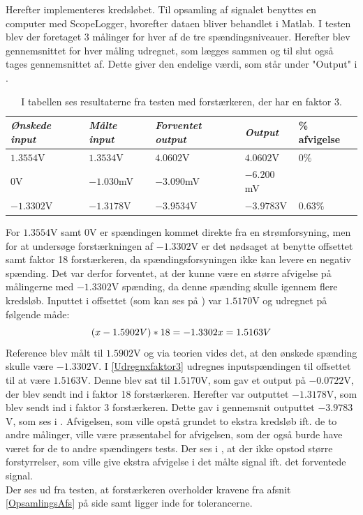 \noindent Herefter implementeres kredsløbet. Til opsamling af signalet benyttes en computer med ScopeLogger, hvorefter dataen bliver behandlet i Matlab. I testen blev der foretaget 3 målinger for hver af de tre spændingsniveauer. Herefter blev gennemsnittet for hver måling udregnet, som lægges sammen og til slut også tages gennemsnittet af. Dette giver den endelige værdi, som står under "Output" i .\

\begin{table}[H]
	\centering
	\begin{tabular}{|l|l|l|l|l|}
		\hline
		\textit{Ønskede input} & \textit{Målte input} & \textit{Forventet output} & \textit{Output} & \% afvigelse \\ \hline
		$1.3554$V              & $1.3534$V            & $4.0602$V                 & $4.0602$V       & $0\%$        \\ \hline
		$0$V                   & $-1.030$mV           & $-3.090$mV                & $-6.200$mV      &              \\ \hline
		$-1.3302$V             & $-1.3178$V           & $-3.9534$V                & $-3.9783$V      & $0.63\%$     \\ \hline
	\end{tabular}
	\caption{I tabellen ses resultaterne fra testen med forstærkeren, der har en faktor 3.}
	\label{Tab:faktor3_test}
\end{table}

For $1.3554$V samt $0$V er spændingen kommet direkte fra en strømforsyning, men for at undersøge forstærkningen af $-1.3302$V er det nødsaget at benytte offsettet samt faktor 18 forstærkeren, da spændingsforsyningen ikke kan levere en negativ spænding. Det var derfor forventet, at der kunne være en større afvigelse på målingerne med $-1.3302$V spænding, da denne spænding skulle igennem flere kredsløb. Inputtet i offsettet (som kan ses på ) var $1.5170$V og udregnet på følgende måde:
\begin{equation}\label{Udregnxfaktor3}
( x - 1.5902V ) * 18 = -1.3302 \\
x = 1.5163V
\end{equation}
Reference blev målt til $1.5902$V og via teorien vides det, at den ønskede spænding skulle være $-1.3302$V. I \eqref{Udregnxfaktor3} udregnes inputspændingen til offsettet til at være $1.5163$V. Denne blev sat til $1.5170$V, som gav et output på $-0.0722$V, der blev sendt ind i faktor 18 forstærkeren. Herefter var outputtet $-1.3178$V, som blev sendt ind i faktor 3 forstærkeren. Dette gav i gennemsnit outputtet $-3.9783$V, som ses i . Afvigelsen, som ville opstå grundet to ekstra kredsløb ift. de to andre målinger, ville være præsentabel for afvigelsen, som der også burde have været for de to andre spændingers tests. Der ses i , at der ikke opstod større forstyrrelser, som ville give ekstra afvigelse i det målte signal ift. det forventede signal. \\
Der ses ud fra testen, at forstærkeren overholder kravene fra afsnit \ref{OpsamlingsAfs} på side \pageref{OpsamlingsAfs} samt ligger inde for tolerancerne.